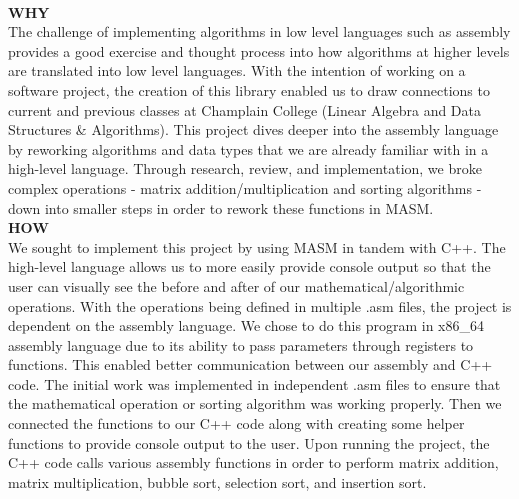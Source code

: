 \documentclass[twoside]{article}
\begin{document}
\noindent \\ \textbf{WHY}
\\The challenge of implementing algorithms in low level languages such as assembly provides a good exercise and thought process into how algorithms at higher levels are translated into low level languages. With the intention of working on a software project, the creation of this library enabled us to draw connections to current and previous classes at Champlain College (Linear Algebra and Data Structures \& Algorithms). This project dives deeper into the assembly language by reworking algorithms and data types that we are already familiar with in a high-level language. Through research, review, and implementation, we broke complex operations - matrix addition/multiplication and sorting algorithms - down into smaller steps in order to rework these functions in MASM.\\


\noindent \textbf{HOW}
\\We sought to implement this project by using MASM in tandem with C++. The high-level language allows us to more easily provide console output so that the user can visually see the before and after of our mathematical/algorithmic operations. With the operations being defined in multiple .asm files, the project is dependent on the assembly language. We chose to do this program in x86\_64 assembly language due to its ability to pass parameters through registers to functions. This enabled better communication between our assembly and C++ code. The initial work was implemented in independent .asm files to ensure that the mathematical operation or sorting algorithm was working properly. Then we connected the functions to our C++ code along with creating some helper functions to provide console output to the user. Upon running the project, the C++ code calls various assembly functions in order to perform matrix addition, matrix multiplication, bubble sort, selection sort, and insertion sort.\\
\end{document}
